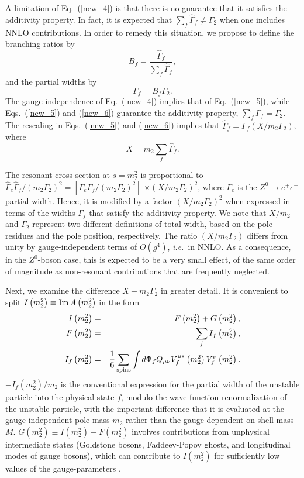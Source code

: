 \documentclass[a4paper,12pt]{article}
\begin{document}
A limitation of Eq.~(\ref{new_4}) is that there is no guarantee that it
satisfies the additivity property.
In fact, it is expected that $\sum_f\hat\Gamma_f\neq\Gamma_2$ when one
includes NNLO contributions.
In order to remedy this situation, we propose to define the branching ratios
by 
\begin{equation}
\label{new_5}
B_f=\frac{\hat\Gamma_f}{\sum_f\hat\Gamma_f},
\end{equation}
and the partial widths by 
\begin{equation}
\label{new_6}
\Gamma_f=B_f\Gamma_2.  
\end{equation}
The gauge independence of Eq.~(\ref{new_4}) implies that of Eq.~(\ref{new_5}),
while Eqs.~(\ref{new_5}) and (\ref{new_6}) guarantee the additivity property,
$\sum_f\Gamma_f=\Gamma_2$.
The rescaling in Eqs.~(\ref{new_5}) and (\ref{new_6}) implies that
$\hat\Gamma_f=\Gamma_f(X/m_2\Gamma_2)$, where
\begin{equation}
\label{new_7}
X=m_2\sum_f\hat\Gamma_f.
\end{equation}

The resonant cross section at $s=m^2_2$ is proportional to 
$\hat\Gamma_e\hat\Gamma_f/(m_2\Gamma_2)^2 
=\left[\Gamma_e\Gamma_f/(m_2\Gamma_2)^2\right]$
$\times(X/m_2\Gamma_2)^2$, where
$\Gamma_e$ is the $Z^0\to e^+e^-$ partial width.
Hence, it is modified by a factor $(X/m_2\Gamma_2)^2$ when expressed in terms
of the widths $\Gamma_f$ that satisfy the additivity property.
We note that $X/m_2$ and $\Gamma_2$ represent two different definitions of
total width, based on the pole residues and the pole position, respectively.
The ratio $(X/m_2\Gamma_2)$ differs from unity by gauge-independent terms of
$O(g^4)$, {\it i.e.}\ in NNLO.
As a consequence, in the $Z^0$-boson case, this is expected to be a very small
effect, of the same order of magnitude as non-resonant contributions that are
frequently neglected.

Next, we examine the difference $X-m_2\Gamma_2$ in greater detail. 
It is convenient to split
$I\left(m^2_2\right)\equiv{\rm Im}\,A\left(m^2_2\right)$ in the form
\begin{eqnarray}
\label{new_9}
I\left(m^2_2\right)&=&F\left(m^2_2\right)+G\left(m^2_2\right),\\
F\left(m^2_2\right)&=&\sum_fI_f\left(m^2_2\right),\\
I_f\left(m^2_2\right)&=&\frac{1}{6}\sum_{\rm spins}\int d\Phi_f 
Q_{\mu\nu}V_f^{\mu*}\left(m_2^2\right)V_f^\nu\left(m_2^2\right). \label{new_11}
\end{eqnarray}
$-I_f(m^2_2)/m_2$ is the conventional expression for the partial width of the
unstable particle into the physical state $f$, modulo the wave-function
renormalization of the unstable particle, with the important difference that
it is evaluated at the gauge-independent pole mass $m_2$ rather than the
gauge-dependent on-shell mass $M$.
$G\left(m^2_2\right)\equiv I\left(m^2_2\right)-F\left(m^2_2\right)$ involves
contributions from unphysical intermediate states (Goldstone bosons,
Faddeev-Popov ghosts, and longitudinal modes of gauge bosons), which can
contribute to $I\left(m^2_2\right)$ for sufficiently low values of the gauge-parameters
\cite{si_1}.
\end{document}
